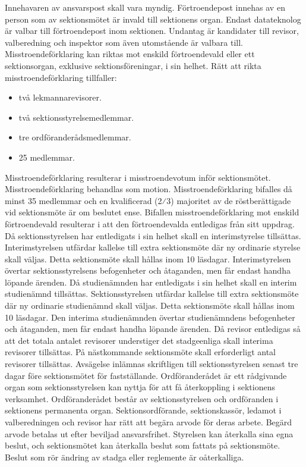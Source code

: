 \documentclass[a4paper]{dteklag}
\begin{document}
\para Innehavaren av ansvarspost skall vara myndig.
\para[Förtroendepost] Förtroendepost innehas av en person som av sektionsmötet är invald till sektionens organ.
\para Endast datateknolog är valbar till förtroendepost inom sektionen. 
\stycke Undantag är kandidater till revisor, valberedning och inspektor som även utomstående är valbara till.
\para[Misstroendeförklaring] Misstroendeförklaring kan riktas mot enskild förtroendevald eller ett sektionsorgan, exklusive sektionsföreningar, i sin helhet.
\para Rätt att rikta misstroendeförklaring tillfaller:
\begin{itemize}
  \item två lekmannarevisorer.
  \item två sektionsstyrelsemedlemmar.
  \item tre ordföranderådsmedlemmar.
  \item 25 medlemmar.
\end{itemize}
\para Misstroendeförklaring resulterar i misstroendevotum inför sektionsmötet. Misstroendeförklaring behandlas som motion.
\para Misstroendeförklaring bifalles då minst 35 medlemmar och en kvalificerad (2⁄3) majoritet av de röstberättigade vid sektionsmöte är om beslutet ense.
\para Bifallen misstroendeförklaring mot enskild förtroendevald resulterar i att den förtroendevalda entledigas från sitt uppdrag.
\para Då sektionsstyrelsen har entledigats i sin helhet skall en interimstyrelse tillsättas. Interimstyrelsen utfärdar kallelse till extra sektionsmöte där ny ordinarie styrelse skall väljas. Detta sektionsmöte skall hållas inom 10 läsdagar. Interimstyrelsen övertar sektionsstyrelsens befogenheter och åtaganden, men får endast handha löpande ärenden.
\para Då studienämnden har entledigats i sin helhet skall en interim studienämnd tillsättas. Sektionsstyrelsen utfärdar kallelse till extra sektionsmöte där ny ordinarie studienämnd skall väljas. Detta sektionsmöte skall hållas inom 10 läsdagar. Den interima studienämnden övertar studienämndens befogenheter och åtaganden, men får endast handha löpande ärenden.
\para Då revisor entledigas så att det totala antalet revisorer understiger det stadgeenliga skall interima revisorer tillsättas. På nästkommande sektionsmöte skall erforderligt antal revisorer tillsättas.
\para[Avsägelse] Avsägelse inlämnas skriftligen till sektionsstyrelsen senast tre dagar före sektionsmötet för fastställande.
\para[Ordföranderåd] Ordföranderådet är ett rådgivande organ som sektionsstyrelsen kan nyttja för att få återkoppling i sektionens verksamhet.
\para Ordföranderådet består av sektionsstyrelsen och ordföranden i sektionens permanenta organ.
\para[Arvode] Sektionsordförande, sektionskassör, ledamot i valberedningen och revisor har rätt att begära arvode för deras arbete.
\para Begärd arvode betalas ut efter beviljad ansvarsfrihet.
\para[Beslutsåterkallelse] Styrelsen kan återkalla sina egna beslut, och sektionsmötet kan återkalla beslut som fattats på sektionsmöte. 
\stycke Beslut som rör ändring av stadga eller reglemente är oåterkalliga.
\end{document}
